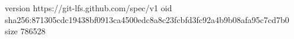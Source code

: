 version https://git-lfs.github.com/spec/v1
oid sha256:871305cdc19438bf0913ca4500edc8a8c23fcbfd3fc92a4b9b08afa95c7cd7b0
size 786528
